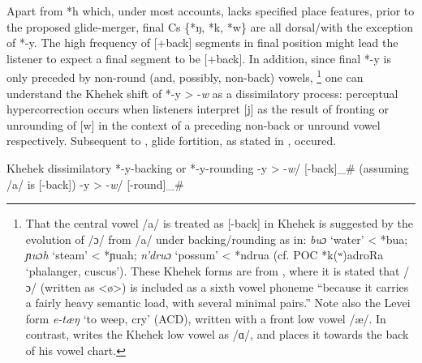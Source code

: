 \documentclass[output=paper]{langscibook}
\begin{document}
Apart from *h which, under most accounts, lacks specified place features, prior to the proposed glide-merger, final Cs \{*ŋ, *k, *w\} are all dorsal\slash\relax [+back] with the exception of *-y. The high frequency of [+back] segments in final position might lead the listener to expect a final segment to be [+back]. In addition, since final *-y is only preceded by non-round (and, possibly, non-back) vowels, \footnote{That the central vowel \mbox{/a/} is treated as [-back] in Khehek is suggested by the evolution of \mbox{/ɔ/} from \mbox{/a/} under backing/rounding as in: \textit{buɔ} ‘water’ < *bua;  \textit{ɲuɔh} ‘steam’ < *ɲuah;  \textit{n’druɔ} ‘possum’ <  *ndrua (cf. POC *k(ʷ)adroRa ‘phalanger, cuscus’). These Khehek forms are from \citet{SIL2004}, where it is stated that \mbox{/ɔ/} (written as <ø>) is included as a sixth vowel phoneme “because it carries a fairly heavy semantic load, with several minimal pairs.” Note also the Levei form \textit{e-tæŋ} ‘to weep, cry’ (ACD), written with a front low vowel \mbox{/æ/}. In contrast, \citet{Beard1992} writes the Khehek low vowel as \mbox{/ɑ/}, and places it towards the back of his vowel chart.} one can understand the Khehek shift of *-y > -\textit{w} as a dissimilatory process: perceptual hypercorrection \citep{Ohala1981} occurs when listeners interpret [j] as the result of fronting  or unrounding  of [w] in the context of a preceding non-back or unround vowel respectively. Subsequent to , glide fortition, as stated in , occured.

\ea%
    \label{ex:blevins:5}
Khehek dissimilatory *-y-backing or *-y-rounding 
\ea *-y > -\textit{w}/ [-back]\_\#  \hspace{1em}   (assuming /a/ is [-back]) \label{ex:blevins:5.1}
\ex *-y > -\textit{w}/ [-round]\_\#   \label{ex:blevins:5.2}
\z
\z
\end{document}
